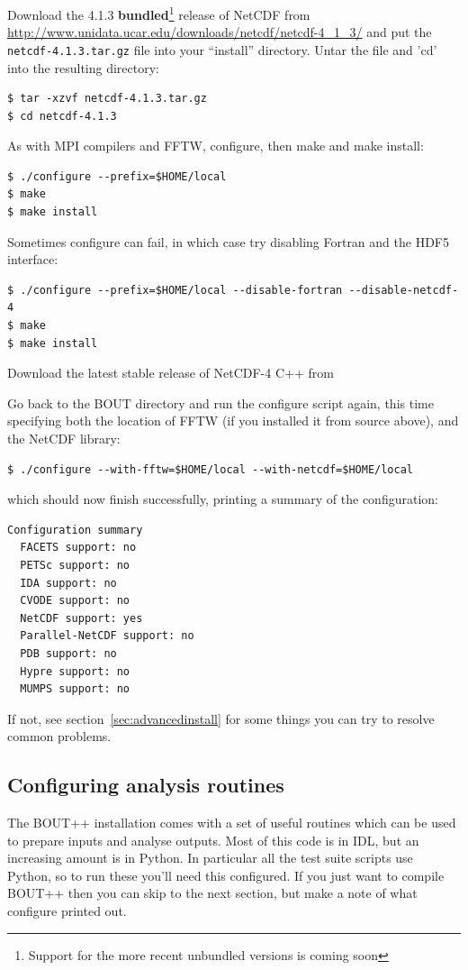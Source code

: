 \documentclass[12pt]{article}
\begin{document}
Download the 4.1.3 {\bf bundled}\footnote{Support for the more recent unbundled
versions is coming soon} release of NetCDF from
\url{http://www.unidata.ucar.edu/downloads/netcdf/netcdf-4_1_3/} and put the
\texttt{netcdf-4.1.3.tar.gz} file into your ``install'' directory. Untar the
file and 'cd' into the resulting directory:
%
\begin{verbatim}
$ tar -xzvf netcdf-4.1.3.tar.gz
$ cd netcdf-4.1.3
\end{verbatim}
%
As with MPI compilers and FFTW, configure, then make and make install:
%
\begin{verbatim}
$ ./configure --prefix=$HOME/local
$ make
$ make install
\end{verbatim}
%
Sometimes configure can fail, in which case try disabling Fortran and the HDF5
interface:
%
\begin{verbatim}
$ ./configure --prefix=$HOME/local --disable-fortran --disable-netcdf-4
$ make
$ make install
\end{verbatim}
%
Download the latest stable release of NetCDF-4 C++ from

Go back to the BOUT directory and run the configure script again, this time
specifying both the location of FFTW (if you installed it from source above),
and the NetCDF library:
%
\begin{verbatim}
$ ./configure --with-fftw=$HOME/local --with-netcdf=$HOME/local
\end{verbatim}
%
which should now finish successfully, printing a summary of the configuration:
%
\begin{verbatim}
Configuration summary
  FACETS support: no
  PETSc support: no
  IDA support: no
  CVODE support: no
  NetCDF support: yes
  Parallel-NetCDF support: no
  PDB support: no
  Hypre support: no
  MUMPS support: no
\end{verbatim}
%
If not, see section~\ref{sec:advancedinstall} for some things you can try to
resolve common problems.



\subsection{Configuring analysis routines}
%
\label{sec:configanalysis}
%
The BOUT++ installation comes with a set of useful routines which can be used
to prepare inputs and analyse outputs. Most of this code is in IDL, but an
increasing amount is in Python. In particular all the test suite scripts use
Python, so to run these you'll need this configured.  If you just want to
compile BOUT++ then you can skip to the next section, but make a note of what
configure printed out.
\end{document}
